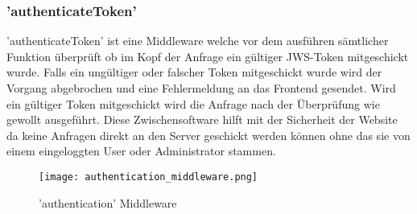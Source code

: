 		 	\subsubsection{'authenticateToken'}
		 		'authenticateToken' ist eine Middleware welche vor dem ausführen sämtlicher Funktion überprüft ob im Kopf der Anfrage ein gültiger JWS-Token mitgeschickt wurde. Falls ein ungültiger oder falscher Token mitgeschickt wurde wird der Vorgang abgebrochen und eine Fehlermeldung an das Frontend gesendet. Wird ein gültiger Token mitgeschickt wird die Anfrage nach der Überprüfung wie gewollt ausgeführt. Diese Zwischensoftware hilft mit der Sicherheit der Website da keine Anfragen direkt an den Server geschickt werden können ohne das sie von einem eingeloggten User oder Administrator stammen. 		 		
		 		\begin{figure}[H]
		 			\centering
		 			\texttt{[image: authentication\_middleware.png]}
		 			\caption{'authentication' Middleware}
		 		\end{figure}